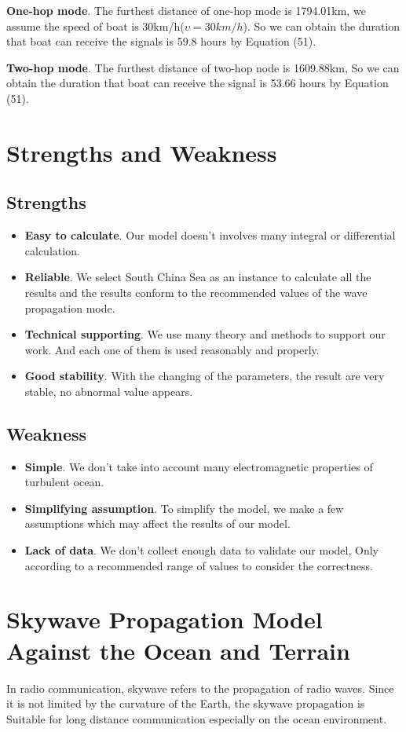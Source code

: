\documentclass{mcmthesis}
\begin{document}
\textbf{One-hop mode}. The furthest distance of one-hop mode is 1794.01km, we assume the speed of boat is 30km/h($\upsilon = 30km/h$). So we can obtain the duration that boat can receive the signals is 59.8 hours by Equation (51).

\textbf{Two-hop mode}. The furthest distance of two-hop node is 1609.88km, So we can obtain the duration that boat can receive the signal is 53.66 hours by Equation (51).

\section{Strengths and Weakness}
\subsection{Strengths}
\begin{itemize}
\item \textbf{Easy to calculate}.  Our model doesn't involves many integral or differential calculation.
\item \textbf{Reliable}. We select South China Sea as an instance to calculate all the results and the results conform to the recommended values of the wave propagation mode.
\item \textbf{Technical supporting}.  We use many theory and methods to support our work. And each one of them is used reasonably and properly.
\item \textbf{Good stability}. With the changing of the parameters, the result are very stable, no abnormal value appears.
\end{itemize}
\subsection{Weakness}

\begin{itemize}
\item \textbf{Simple}. We don't take into account many electromagnetic properties of turbulent ocean.
\item \textbf{Simplifying assumption}.  To simplify the model, we make a few assumptions which may affect the results of our model.
\item \textbf{Lack of data}. We don't collect enough data to validate our model, Only according to a recommended range of values to consider the correctness.
\end{itemize}

 \newpage
 \section{Skywave Propagation Model Against the Ocean and Terrain}
 In radio communication, skywave refers to the propagation of radio waves. Since it is not limited by the curvature of the Earth, the skywave propagation is Suitable for long distance communication especially on the ocean environment.
 
\end{document}
